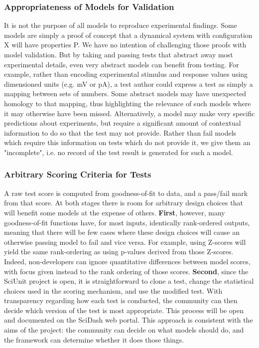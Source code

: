 \documentclass[11pt,letterpaper]{article}
\begin{document}
\subsubsection{Appropriateness of Models for Validation}
It is not the purpose of all models to reproduce experimental findings.  Some models are simply a proof of concept that a dynamical system with configuration X will have properties P.  We have no intention of challenging those proofs with model validation. But by taking and passing tests that abstract away most experimental details, even very abstract models can benefit from testing.  For example, rather than encoding experimental stimulus and response values using dimensioned units (e.g. mV or pA), a test author could express a test as simply a mapping between sets of numbers.  Some abstract models may have unexpected homology to that mapping, thus highlighting the relevance of such models where it may otherwise have been missed.  Alternatively, a model may make very specific predictions about experiments, but require a significant amount of contextual information to do so that the test may not provide.  Rather than fail models which require this information on tests which do not provide it, we give them an "incomplete", i.e. no record of the test result is generated for such a model.  

\subsubsection{Arbitrary Scoring Criteria for Tests}
A raw test score is computed from goodness-of-fit to data, and a pass/fail mark from that score.  At both stages there is room for arbitrary design choices that will benefit some models at the expense of others.  \textbf{First}, however, many goodness-of-fit functions have, for most inputs, identically rank-ordered outputs, meaning that there will be few cases where these design choices will cause an otherwise passing model to fail and vice versa.  For example, using Z-scores will yield the same rank-ordering as using p-values derived from those Z-scores.  Indeed, non-developers can ignore quantitative differences between model scores, with focus given instead to the rank ordering of those scores. \textbf{Second}, since the SciUnit project is open, it is straightforward to clone a test, change the statistical choices used in the scoring mechanism, and use the modified test.  With transparency regarding how each test is conducted, the community can then decide which version of the test is most appropriate.  This process will be open and documented on the SciDash web portal.  This approach is consistent with the aims of the project: the community can decide on what models should do, and the framework can determine whether it does those things. 
\end{document}
